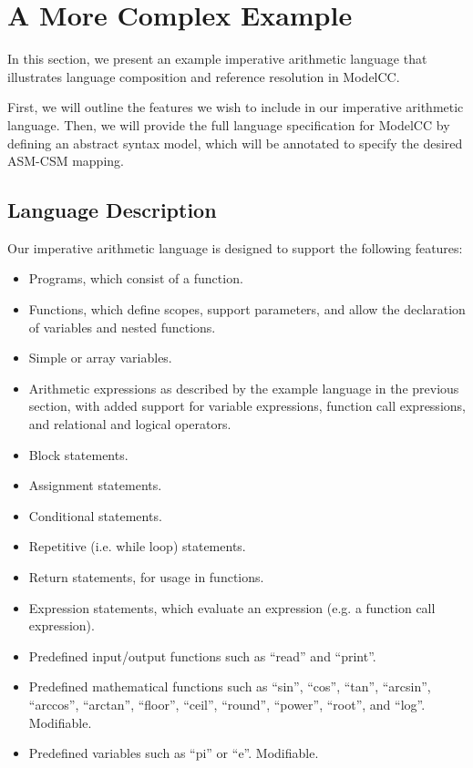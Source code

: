 \documentclass[preprint]{elsarticle}
\begin{document}
\section{A More Complex Example} \label{sec:example2}

In this section, we present an example imperative arithmetic language that illustrates language composition and reference resolution in ModelCC.

First, we will outline the features we wish to include in our imperative arithmetic language.
Then, we will provide the full language specification for ModelCC by defining an abstract syntax model, which will be annotated to specify the desired ASM-CSM mapping.

\subsection{Language Description}

Our imperative arithmetic language is designed to support the following features:

\begin{itemize}
\item Programs, which consist of a function.
\item Functions, which define scopes, support parameters, and allow the declaration of variables and nested functions.
\item Simple or array variables.
\item Arithmetic expressions as described by the example language in the previous section, with added support for variable expressions, function call expressions, and relational and logical operators.
\item Block statements.
\item Assignment statements.
\item Conditional statements.
\item Repetitive (i.e. while loop) statements.
\item Return statements, for usage in functions.
\item Expression statements, which evaluate an expression (e.g. a function call expression).
\item Predefined input/output functions such as ``read'' and ``print''.
\item Predefined mathematical functions such as ``sin'', ``cos'', ``tan'', ``arcsin'', ``arccos'', ``arctan'', ``floor'', ``ceil'', ``round'', ``power'', ``root'', and ``log''. Modifiable.
\item Predefined variables such as ``pi'' or ``e''. Modifiable.
\end{itemize}
\end{document}
